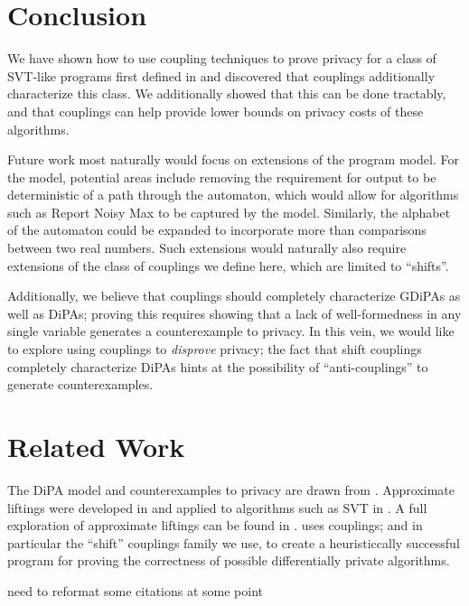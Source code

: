 \documentclass[12pt]{article}
\theoremstyle{definition}
\begin{document}
\section{Conclusion}
We have shown how to use coupling techniques to prove privacy for a class of SVT-like programs first defined in \cite{chadhaLinearTimeDecidability2021} and discovered that couplings additionally characterize this class. We additionally showed that this can be done tractably, and that couplings can help provide lower bounds on privacy costs of these algorithms. 

Future work most naturally would focus on extensions of the program model. For the model, potential areas include removing the requirement for output to be deterministic of a path through the automaton, which would allow for algorithms such as Report Noisy Max to be captured by the model. Similarly, the alphabet of the automaton could be expanded to incorporate more than comparisons between two real numbers. 
Such extensions would naturally also require extensions of the class of couplings we define here, which are limited to ``shifts''. 

Additionally, we believe that couplings should completely characterize GDiPAs as well as DiPAs; proving this requires showing that a lack of well-formedness in any single variable generates a counterexample to privacy. 
In this vein, we would like to explore using couplings to \textit{disprove} privacy; the fact that shift couplings completely characterize DiPAs hints at the possibility of ``anti-couplings'' to generate counterexamples.

\section{Related Work}
The DiPA model and counterexamples to privacy are drawn from \cite{chadhaLinearTimeDecidability2021}. Approximate liftings were developed in \cite{bartheKopfOlmedo2012ProbabilisticRelationalReasoningforDifferentialPriv,BartheOlmedo2013} and applied to algorithms such as SVT in \cite{BartheEtAl2016}.
A full exploration of approximate liftings can be found in \cite{HsuThesis2017}. \cite{AlbarghouthiHsu2018} uses couplings; and in particular the ``shift'' couplings family we use, to create a heuristiccally successful program for proving the correctness of possible differentially private algorithms. 


{\color{red} need to reformat some citations at some point}

\end{document}
